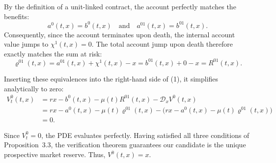 By the definition of a unit-linked contract, the account perfectly matches the benefits:
\[
  a^0(t,x) = b^0(t,x) \quad \text{and} \quad a^{01}(t,x) = b^{01}(t,x).
\]
Consequently, since the account terminates upon death, the internal account value jumps to $\chi^1(t,x) = 0$. The total account jump upon death therefore exactly matches the sum at risk:
\[
  \varrho^{01}(t,x) = a^{01}(t,x) + \chi^1(t,x) - x = b^{01}(t,x) + 0 - x = R^{01}(t,x).
\]

Inserting these equivalences into the right-hand side of (1), it simplifies analytically to zero:
\begin{align*}
  V_t^0(t,x) & = r x - b^0(t,x) - \mu(t) R^{01}(t, x) - \mathcal{D}_x V^0(t, x)                                     \\
             & = r x - a^0(t,x) - \mu(t) \varrho^{01}(t, x) - \bigl(rx - a^0(t,x) - \mu(t) \varrho^{01}(t, x)\bigr) \\
             & = 0.
\end{align*}

Since $V_t^0 = 0$, the PDE evaluates perfectly. Having satisfied all three conditions of Proposition~3.3, the verification theorem guarantees our candidate is the unique prospective market reserve. Thus, $V^0(t,x) = x$.

